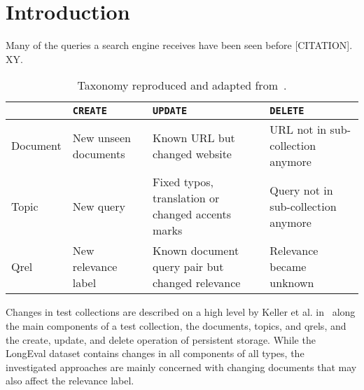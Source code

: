 \section{Introduction}

Many of the queries a search engine receives have been seen before {\color{red}[CITATION]}. XY.

\begin{table}
    \caption{Taxonomy reproduced and adapted from~\cite{keller:2024}.}
    \label{tab:CRUD}
    \begin{tabularx}{\linewidth}{l | X | X | X}
        \toprule
        {}       & \texttt{CREATE}          & \texttt{UPDATE}                 & \texttt{DELETE} \\ \midrule
        Document & New unseen documents     & Known URL but changed website   & URL not in sub-collection anymore              \\\midrule
        Topic    & New query                & Fixed typos, translation or changed accents marks                               & Query not in sub-collection anymore \\\midrule
        Qrel     & New relevance label      & Known document query pair but changed relevance & Relevance became unknown   \\\bottomrule
    \end{tabularx}
\end{table}

Changes in test collections are described on a high level by Keller et al. in~\cite{keller:2024} along the main components of a test collection, the documents, topics, and qrels, and the create, update, and delete operation of persistent storage. While the LongEval dataset contains changes in all components of all types, the investigated approaches are mainly concerned with changing documents that may also affect the relevance label.






